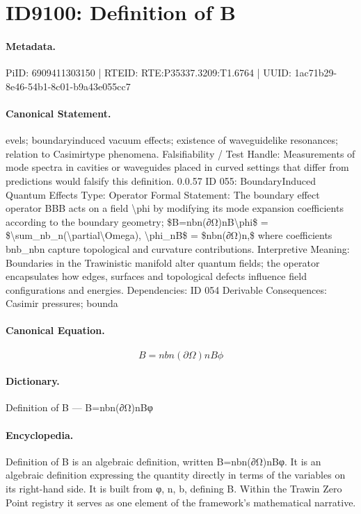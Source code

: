 \section*{ID9100: Definition of B}
\paragraph{Metadata.}
PiID: 6909411303150 | RTEID: RTE:P35337.3209:T1.6764 | UUID: 1ac71b29-8e46-54b1-8c01-b9a43e055cc7

\paragraph{Canonical Statement.}
evels; boundaryinduced vacuum effects; existence of waveguidelike resonances; relation to Casimirtype phenomena. Falsifiability / Test Handle: Measurements of mode spectra in cavities or waveguides placed in curved settings that differ from predictions would falsify this definition. 0.0.57 ID 055: BoundaryInduced Quantum Effects Type: Operator Formal Statement: The boundary effect operator BBB acts on a field \textbackslash{}phi by modifying its mode expansion coefficients according to the boundary geometry; \$B=nbn(∂Ω)nB\textbackslash{}phi\$ = \$\textbackslash{}sum\_nb\_n(\textbackslash{}partial\textbackslash{}Omega), \textbackslash{}phi\_nB\$ = \$nbn(∂Ω)n,\$ where coefficients bnb\_nbn capture topological and curvature contributions. Interpretive Meaning: Boundaries in the Trawinistic manifold alter quantum fields; the operator encapsulates how edges, surfaces and topological defects influence field configurations and energies. Dependencies: ID 054 Derivable Consequences: Casimir pressures; bounda

\paragraph{Canonical Equation.}
\[
B=nbn(∂Ω)nB\phi
\]

\paragraph{Dictionary.}
Definition of B — B=nbn(∂Ω)nBφ

\paragraph{Encyclopedia.}
Definition of B is an algebraic definition, written B=nbn(∂Ω)nBφ. It is an algebraic definition expressing the quantity directly in terms of the variables on its right-hand side. It is built from φ, n, b, defining B. Within the Trawin Zero Point registry it serves as one element of the framework's mathematical narrative.
